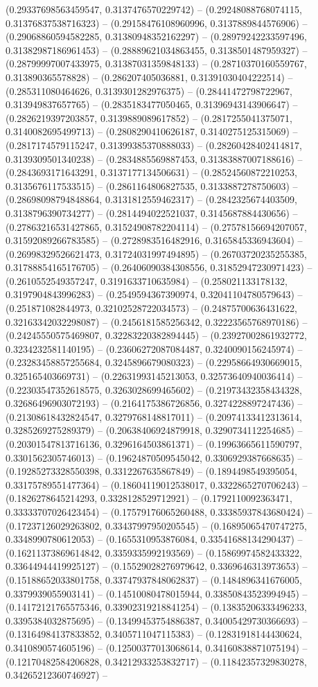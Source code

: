 (0.29337698563459547, 0.3137476570229742) -- (0.29248088768074115, 0.31376837538716323) -- (0.29158476108960996, 0.3137889844576906) -- (0.29068860594582285, 0.31380948352162297) -- (0.28979242233597496, 0.31382987186961453) -- (0.28889621034863455, 0.3138501487959327) -- (0.28799997007433975, 0.31387031359848133) -- (0.28710370160559767, 0.313890365578828) -- (0.286207405036881, 0.31391030404222514) -- (0.285311080464626, 0.3139301282976375) -- (0.28441472798722967, 0.313949837657765) -- (0.2835183477050465, 0.31396943143906647) -- (0.2826219397203857, 0.3139889089617852) -- (0.2817255041375071, 0.3140082695499713) -- (0.2808290410626187, 0.3140275125315069) -- (0.2817174579115247, 0.31399385370888033) -- (0.28260428402414817, 0.3139309501340238) -- (0.2834885569887453, 0.31383887007188616) -- (0.2843693171643291, 0.3137177134506631) -- (0.28524560872210253, 0.3135676117533515) -- (0.2861164806827535, 0.3133887278750603) -- (0.28698098794848864, 0.3131812559462317) -- (0.2842325674403509, 0.3138796390734277) -- (0.2814494022521037, 0.3145687884430656) -- (0.27863216531427865, 0.31524908782204114) -- (0.27578156694207057, 0.31592089266783585) -- (0.2728983516482916, 0.3165845336943604) -- (0.26998329526621473, 0.31724031997494895) -- (0.26703720235255385, 0.31788854165176705) -- (0.26406090384308556, 0.31852947230971423) -- (0.2610552549357247, 0.3191633710635984) -- (0.258021133178132, 0.3197904843996283) -- (0.2549594367390974, 0.32041104780579643) -- (0.251871082844973, 0.32102528722034573) -- (0.24875700636431622, 0.32163342032298087) -- (0.2456181585256342, 0.32223565768970186) -- (0.24245550575469807, 0.32283220382894445) -- (0.23927002861932772, 0.3234232581140195) -- (0.23606272087084487, 0.3240090156245974) -- (0.23283458857255684, 0.3245896679080323) -- (0.22958664930669015, 0.325165403669731) -- (0.22631993145213053, 0.32573640940036414) -- (0.22303547352618575, 0.3263028699465602) -- (0.21973432358434328, 0.32686496903072193) -- (0.2164175386726856, 0.3274228897247436) -- (0.21308618432824547, 0.3279768148817011) -- (0.20974133412313614, 0.3285269275289379) -- (0.20638406924879918, 0.3290734112254685) -- (0.20301547813716136, 0.3296164503861371) -- (0.19963665611590797, 0.3301562305746013) -- (0.19624870509545042, 0.3306929387668635) -- (0.19285273328550398, 0.3312267635867849) -- (0.1894498549395054, 0.33175789551477364) -- (0.18604119012538017, 0.3322865270706243) -- (0.1826278645214293, 0.3328128529712921) -- (0.1792110092363471, 0.33333707026423454) -- (0.17579176065260488, 0.33385937843680424) -- (0.17237126029263802, 0.33437997950205545) -- (0.16895065470747275, 0.3348990780612053) -- (0.1655310953876084, 0.33541688134290437) -- (0.16211373869614842, 0.3359335992193569) -- (0.15869974582433322, 0.33644944419925127) -- (0.15529028276979642, 0.3369646313973653) -- (0.15188652033801758, 0.33747937848062837) -- (0.1484896341676005, 0.3379939055903141) -- (0.14510080478015944, 0.33850843523994945) -- (0.14172121765575346, 0.33902319218841254) -- (0.13835206333496233, 0.3395384032875695) -- (0.13499453754886387, 0.34005429730366693) -- (0.13164984137833852, 0.3405711047115383) -- (0.12831918144430624, 0.3410890574605196) -- (0.12500377013068614, 0.34160838871075194) -- (0.12170482584206828, 0.34212933253832717) -- (0.11842357329830278, 0.34265212360746927) -- 